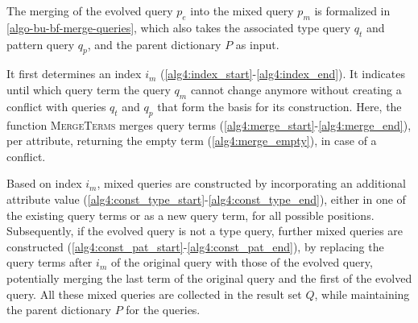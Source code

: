 The merging of the evolved query $p_e$ into the mixed query $p_m$ is
formalized in \autoref{algo-bu-bf-merge-queries}, which also takes the
associated type query $q_t$ and pattern query $q_p$, and the parent
dictionary $P$ as input.

It first determines an index ${i_m}$
(\autoref{alg4:index_start}-\ref{alg4:index_end}). It indicates until which
query term the query $q_m$ cannot change anymore without creating a conflict
with queries $q_t$ and $q_p$ that form the basis for its construction. Here,
the function \textsc{MergeTerms} merges query terms
(\autoref{alg4:merge_start}-\ref{alg4:merge_end}), per attribute, returning
the empty term (\autoref{alg4:merge_empty}), in case of a conflict.

Based on index ${i_m}$, mixed queries are constructed by incorporating an
additional attribute value
(\autoref{alg4:const_type_start}-\ref{alg4:const_type_end}), either in one
of the existing query terms or as a new query term, for all possible
positions. Subsequently, if the evolved query is not a type query, further
mixed queries are constructed
(\autoref{alg4:const_pat_start}-\ref{alg4:const_pat_end}), by replacing the
query terms after ${i_m}$ of the original query with those of the evolved
query, potentially merging the last term of the original query and the first
of the evolved query. All these mixed queries are collected in the result
set $Q$, while maintaining the parent dictionary $P$ for the queries.



